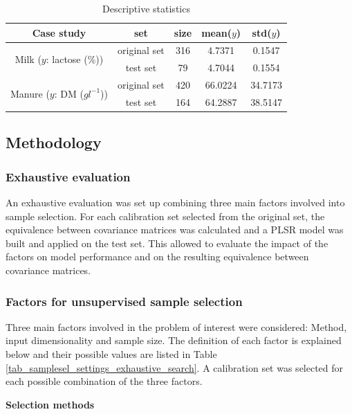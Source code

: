 \documentclass[journal=ancham,manuscript=article]{achemso}
\begin{document}
\begin{table}[t]
\centering
\begin{tabular}{|c|c|c|c|c|} 
\hline
Case study	& set & size & mean($y$) & std($y$)  	\\
\hline
\multirow{2}{10em}{Milk ($y$: lactose (\%))} & original set & 316 & 4.7371 & 0.1547\\
& test set & 79 & 4.7044 & 0.1554\\
\hline
\multirow{2}{10em}{Manure ($y$: DM ($gl^{-1}$))} & original set & 420 & 66.0224 & 34.7173\\
& test set & 164 & 64.2887 & 38.5147 \\
\hline 


\end{tabular}
\caption{Descriptive statistics}
\label{tab_descriptive_statistics}
\end{table}

\subsection{Methodology}\label{methodology}

\subsubsection{Exhaustive evaluation}

An exhaustive evaluation was set up combining three main factors involved into sample selection. For each calibration set selected from the original set, the equivalence between covariance matrices was calculated and a PLSR model was built and applied on the test set. This allowed to evaluate the impact of the factors on model performance and on the resulting equivalence between covariance matrices. 


\subsubsection{Factors for unsupervised sample selection}

Three main factors involved in the problem of interest were considered: Method, input dimensionality and sample size. The definition of each factor is explained below and their possible values are listed in Table \ref{tab_samplesel_settings_exhaustive_search}. A calibration set was selected for each possible combination of the three factors.

\textbf{Selection methods}
\end{document}
